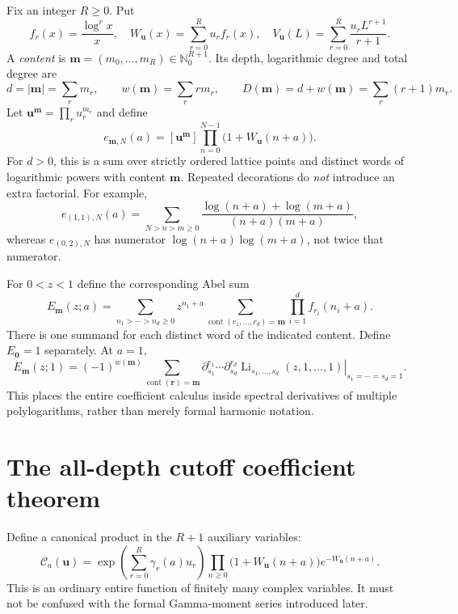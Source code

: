 \documentclass[11pt,oneside]{article}
\numberwithin{equation}{section}
\theoremstyle{definition}
\theoremstyle{remark}
\DeclareMathOperator{\Li}{Li}
\DeclareMathOperator{\cont}{cont}
\newcommand{\N}{\mathbb N}
\newcommand{\uu}{\mathbf u}
\newcommand{\mm}{\mathbf m}
\newcommand{\CC}{\mathcal C}
\begin{document}
Fix an integer $R\ge0$. Put
\[
f_r(x)=\frac{\log^r x}{x},\quad
W_{\uu}(x)=\sum_{r=0}^R u_r f_r(x),\quad
V_{\uu}(L)=\sum_{r=0}^R\frac{u_r L^{r+1}}{r+1}.
\]
A \emph{content} is $\mm=(m_0,\ldots,m_R)\in\N_0^{R+1}$. Its depth,
logarithmic degree and total degree are
\begin{equation}\label{eq:degrees}
d=|\mm|=\sum_r m_r,\qquad
w(\mm)=\sum_r r m_r,\qquad
D(\mm)=d+w(\mm)=\sum_r(r+1)m_r.
\end{equation}
Let $\uu^{\mm}=\prod_r u_r^{m_r}$ and define
\begin{equation}\label{eq:finite-product}
e_{\mm,N}(a)=[\uu^{\mm}]
 \prod_{n=0}^{N-1}\bigl(1+W_{\uu}(n+a)\bigr).
\end{equation}
For $d>0$, this is a sum over strictly ordered lattice points and distinct
words of logarithmic powers with content $\mm$. Repeated decorations do
\emph{not} introduce an extra factorial. For example,
\[
e_{(1,1),N}(a)=\sum_{N>n>m\ge0}
 \frac{\log(n+a)+\log(m+a)}{(n+a)(m+a)},
\]
whereas $e_{(0,2),N}$ has numerator $\log(n+a)\log(m+a)$, not twice that
numerator.

For $0<z<1$ define the corresponding Abel sum
\begin{equation}\label{eq:E}
E_{\mm}(z;a)=\sum_{n_1>\cdots>n_d\ge0}z^{n_1+a}
 \sum_{\cont(r_1,\ldots,r_d)=\mm}\prod_{i=1}^d f_{r_i}(n_i+a).
\end{equation}
There is one summand for each distinct word of the indicated content. Define
$E_{\mathbf0}=1$ separately. At $a=1$,
\begin{equation}\label{eq:spectral-decorations}
E_{\mm}(z;1)=(-1)^{w(\mm)}
 \sum_{\cont(\mathbf r)=\mm}
 \left.\partial_{s_1}^{r_1}\cdots\partial_{s_d}^{r_d}
 \Li_{s_1,\ldots,s_d}(z,1,\ldots,1)\right|_{s_1=\cdots=s_d=1}.
\end{equation}
This places the entire coefficient calculus inside spectral derivatives of
multiple polylogarithms, rather than merely formal harmonic notation.

\section{The all-depth cutoff coefficient theorem}
\label{sec:cutoff}

Define a canonical product in the $R+1$ auxiliary variables:
\begin{equation}\label{eq:Cproduct}
\CC_a(\uu)=\exp\!\left(\sum_{r=0}^R\gamma_r(a)u_r\right)
 \prod_{n\ge0}\bigl(1+W_{\uu}(n+a)\bigr)
                    e^{-W_{\uu}(n+a)}.
\end{equation}
This is an ordinary entire function of finitely many complex variables. It
must not be confused with the formal Gamma-moment series introduced later.
\end{document}

